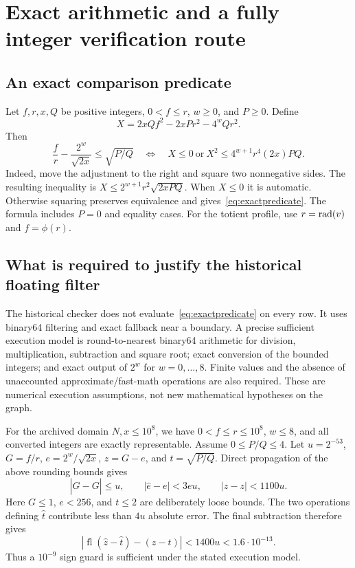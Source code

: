 \section{Exact arithmetic and a fully integer verification route}\label{app:arithmetic}
\subsection{An exact comparison predicate}
Let $f,r,x,Q$ be positive integers, $0<f\le r$, $w\ge0$, and $P\ge0$. Define
\[
 X=2xQf^2-2xPr^2-4^wQr^2.
\]
Then
\begin{equation}\label{eq:exactpredicate}
 \frac fr-\frac{2^w}{\sqrt{2x}}\le\sqrt{P/Q}
 \quad\Longleftrightarrow\quad
 X\le0\ \text{or}\ X^2\le4^{w+1}r^4(2x)PQ.
\end{equation}
Indeed, move the adjustment to the right and square two nonnegative sides. The resulting inequality is
$X\le2^{w+1}r^2\sqrt{2xPQ}$. When $X\le0$ it is automatic. Otherwise squaring preserves equivalence and gives~\eqref{eq:exactpredicate}. The formula includes $P=0$ and equality cases. For the totient profile, use $r=\operatorname{rad}(v)$ and $f=\phi(r)$.

\subsection{What is required to justify the historical floating filter}
The historical checker does not evaluate~\eqref{eq:exactpredicate} on every row. It uses binary64 filtering and exact fallback near a boundary. A precise sufficient execution model is round-to-nearest binary64 arithmetic for division, multiplication, subtraction and square root; exact conversion of the bounded integers; and exact output of $2^w$ for $w=0,\ldots,8$. Finite values and the absence of unaccounted approximate/fast-math operations are also required. These are numerical execution assumptions, not new mathematical hypotheses on the graph.

For the archived domain $N,x\le10^8$, we have $0<f\le r\le10^8$, $w\le8$, and all converted integers are exactly representable. Assume $0\le P/Q\le4$. Let $u=2^{-53}$, $G=f/r$, $e=2^w/\sqrt{2x}$, $z=G-e$, and $t=\sqrt{P/Q}$. Direct propagation of the above rounding bounds gives
\[
 |\widehat G-G|\le u,\qquad
 |\widehat e-e|<3eu,\qquad
 |\widehat z-z|<1100u.
\]
Here $G\le1$, $e<256$, and $t\le2$ are deliberately loose bounds. The two operations defining $\widehat t$ contribute less than $4u$ absolute error. The final subtraction therefore gives
\[
 |\operatorname{fl}(\widehat z-\widehat t)-(z-t)|<1400u<1.6\cdot10^{-13}.
\]
Thus a $10^{-9}$ sign guard is sufficient under the stated execution model.

